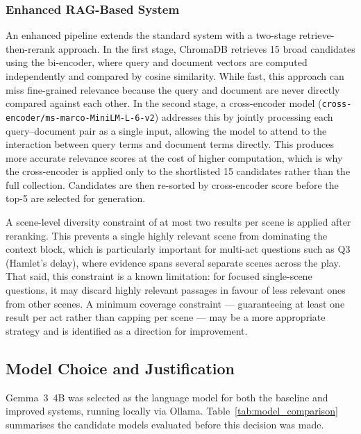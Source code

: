 \documentclass[10pt,conference]{IEEEtran}
\begin{document}
\subsubsection{Enhanced RAG-Based System}

An enhanced pipeline extends the standard system with a two-stage
retrieve-then-rerank approach. In the first stage, ChromaDB
retrieves 15 broad candidates using the bi-encoder, where query and
document vectors are computed independently and compared by cosine
similarity. While fast, this approach can miss fine-grained
relevance because the query and document are never directly
compared against each other. In the second stage, a cross-encoder
model (\texttt{cross-encoder/ms-marco-MiniLM-L-6-v2}) addresses
this by jointly processing each query--document pair as a single
input, allowing the model to attend to the interaction between
query terms and document terms directly. This produces more
accurate relevance scores at the cost of higher computation, which
is why the cross-encoder is applied only to the shortlisted 15
candidates rather than the full collection. Candidates are then
re-sorted by cross-encoder score before the top-5 are selected for
generation.

A scene-level diversity constraint of at most two results per scene
is applied after reranking. This prevents a single highly relevant
scene from dominating the context block, which is particularly
important for multi-act questions such as Q3 (Hamlet's delay),
where evidence spans several separate scenes across the play. That
said, this constraint is a known limitation: for focused
single-scene questions, it may discard highly relevant passages in
favour of less relevant ones from other scenes. A minimum coverage
constraint --- guaranteeing at least one result per act rather than
capping per scene --- may be a more appropriate strategy and is
identified as a direction for improvement.

\subsection{Model Choice and Justification}

Gemma~3~4B was selected as the language model for both the baseline
and improved systems, running locally via Ollama.
Table~\ref{tab:model_comparison} summarises the candidate models
evaluated before this decision was made.
\end{document}
